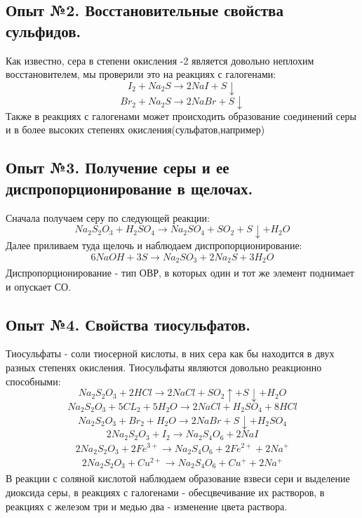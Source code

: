 \documentclass[a4paper,12pt]{article}
\begin{document}
\subsection{Опыт №2. Восстановительные свойства сульфидов.}
Как известно, сера в степени окисления -2 является довольно неплохим восстановителем, мы проверили это на реакциях с галогенами:
\begin{equation}
    I_2 + Na_2S \xrightarrow[]{} 2NaI + S\downarrow
\end{equation}
\begin{equation}
    Br_2 + Na_2S \xrightarrow{} 2NaBr + S\downarrow
\end{equation}
Также в реакциях с галогенами может происходить образование соединений серы и в более высоких степенях окисления(сульфатов,например)
\subsection{Опыт №3. Получение серы и ее диспропорционирование в щелочах.}
Сначала получаем серу по следующей реакции:
\begin{equation}
    Na_2S_2O_3 + H_2 SO_4 \xrightarrow[]{} Na_2SO_4 + SO_2 + S\downarrow + H_2O
\end{equation}
Далее приливаем туда щелочь и наблюдаем диспропорционирование:
\begin{equation}
    6NaOH + 3S \xrightarrow[]{} Na_2SO_3 + 2Na_2S + 3H_2O
\end{equation}
Диспропорционирование - тип ОВР, в которых один и тот же элемент поднимает и опускает СО.
\subsection{Опыт №4. Свойства тиосульфатов.}
Тиосульфаты - соли тиосерной кислоты, в них сера как бы находится в двух разных степенях окисления. Тиосульфаты являются довольно реакционно способными:
\begin{equation}
    Na_2S_2O_3 + 2HCl \xrightarrow[]{} 2NaCl + SO_2\uparrow + S\downarrow + H_2O
\end{equation}
\begin{equation}
    Na_2S_2O_3 + 5CL_2 + 5H_2O \xrightarrow[]{} 2NaCl + H_2SO_4 + 8HCl
\end{equation}
\begin{equation}
     Na_2S_2O_3 + Br_2 + H_2O \xrightarrow[]{} 2NaBr + S\downarrow + H_2SO_4
\end{equation}
\begin{equation}
     2Na_2S_2O_3 + I_2 \xrightarrow[]{} Na_2S_4O_6 + 2NaI
\end{equation}
\begin{equation}
    2Na_2S_2O_3 + 2Fe^{3+} \xrightarrow[]{} Na_2S_4O_6 + 2Fe^{2+} + 2Na^+
\end{equation}
\begin{equation}
     2Na_2S_2O_3 + Cu^{2+} \xrightarrow[]{} Na_2S_4O_6 + Cu^{+} + 2Na^+
\end{equation}
В реакции с соляной кислотой наблюдаем образование взвеси сери и выделение диоксида серы, в реакциях с галогенами - обесцвечивание их растворов, в реакциях с железом три и медью два - изменение цвета раствора.
\end{document}
